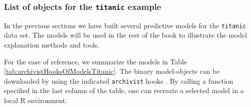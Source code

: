 \documentclass[12pt,]{krantz}
\begin{document}
\hypertarget{ListOfModelsTitanic}{%
\subsubsection{\texorpdfstring{List of objects for the \texttt{titanic} example}{List of objects for the titanic example}}\label{ListOfModelsTitanic}}

In the previous sections we have built several predictive models for the \texttt{titanic} data set. The models will be used in the rest of the book to illustrate the model explanation methods and tools.

For the ease of reference, we summarize the models in Table \ref{tab:archivistHooksOfModelsTitanic}. The binary model-objects can be downloaded by using the indicated \texttt{archivist} hooks \citep{archivist}. By calling a function specified in the last column of the table, one can recreate a selected model in a local R environment.
\end{document}

